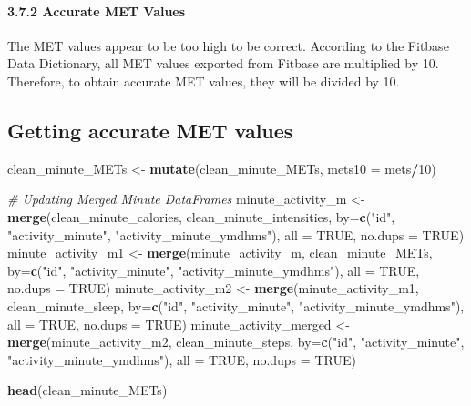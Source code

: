 \documentclass[
]{article}
\newenvironment{Shaded}{\begin{snugshade}}{\end{snugshade}}
\newcommand{\AttributeTok}[1]{\textcolor[rgb]{0.13,0.29,0.53}{#1}}
\newcommand{\CommentTok}[1]{\textcolor[rgb]{0.56,0.35,0.01}{\textit{#1}}}
\newcommand{\ConstantTok}[1]{\textcolor[rgb]{0.56,0.35,0.01}{#1}}
\newcommand{\DecValTok}[1]{\textcolor[rgb]{0.00,0.00,0.81}{#1}}
\newcommand{\FunctionTok}[1]{\textcolor[rgb]{0.13,0.29,0.53}{\textbf{#1}}}
\newcommand{\NormalTok}[1]{#1}
\newcommand{\OtherTok}[1]{\textcolor[rgb]{0.56,0.35,0.01}{#1}}
\newcommand{\SpecialCharTok}[1]{\textcolor[rgb]{0.81,0.36,0.00}{\textbf{#1}}}
\newcommand{\StringTok}[1]{\textcolor[rgb]{0.31,0.60,0.02}{#1}}
\begin{document}
\hypertarget{accurate-met-values}{%
\paragraph{3.7.2 Accurate MET Values}\label{accurate-met-values}}

The MET values appear to be too high to be correct. According to the
Fitbase Data Dictionary, all MET values exported from Fitbase are
multiplied by 10. Therefore, to obtain accurate MET values, they will be
divided by 10.

\hypertarget{getting-accurate-met-values}{%
\subsection{Getting accurate MET
values}\label{getting-accurate-met-values}}

\begin{Shaded}
\begin{Highlighting}[]
\NormalTok{clean\_minute\_METs }\OtherTok{\textless{}{-}} \FunctionTok{mutate}\NormalTok{(clean\_minute\_METs, }\AttributeTok{mets10 =}\NormalTok{ mets}\SpecialCharTok{/}\DecValTok{10}\NormalTok{)}


\CommentTok{\# Updating Merged Minute DataFrames}
\NormalTok{minute\_activity\_m }\OtherTok{\textless{}{-}} \FunctionTok{merge}\NormalTok{(clean\_minute\_calories, clean\_minute\_intensities, }\AttributeTok{by=}\FunctionTok{c}\NormalTok{(}\StringTok{"id"}\NormalTok{, }\StringTok{"activity\_minute"}\NormalTok{, }\StringTok{"activity\_minute\_ymdhms"}\NormalTok{), }\AttributeTok{all =} \ConstantTok{TRUE}\NormalTok{, }\AttributeTok{no.dups =} \ConstantTok{TRUE}\NormalTok{)}
\NormalTok{minute\_activity\_m1 }\OtherTok{\textless{}{-}} \FunctionTok{merge}\NormalTok{(minute\_activity\_m, clean\_minute\_METs, }\AttributeTok{by=}\FunctionTok{c}\NormalTok{(}\StringTok{"id"}\NormalTok{, }\StringTok{"activity\_minute"}\NormalTok{, }\StringTok{"activity\_minute\_ymdhms"}\NormalTok{), }\AttributeTok{all =} \ConstantTok{TRUE}\NormalTok{, }\AttributeTok{no.dups =} \ConstantTok{TRUE}\NormalTok{)}
\NormalTok{minute\_activity\_m2 }\OtherTok{\textless{}{-}} \FunctionTok{merge}\NormalTok{(minute\_activity\_m1, clean\_minute\_sleep, }\AttributeTok{by=}\FunctionTok{c}\NormalTok{(}\StringTok{"id"}\NormalTok{, }\StringTok{"activity\_minute"}\NormalTok{, }\StringTok{"activity\_minute\_ymdhms"}\NormalTok{), }\AttributeTok{all =} \ConstantTok{TRUE}\NormalTok{, }\AttributeTok{no.dups =} \ConstantTok{TRUE}\NormalTok{)}
\NormalTok{minute\_activity\_merged }\OtherTok{\textless{}{-}} \FunctionTok{merge}\NormalTok{(minute\_activity\_m2, clean\_minute\_steps, }\AttributeTok{by=}\FunctionTok{c}\NormalTok{(}\StringTok{"id"}\NormalTok{, }\StringTok{"activity\_minute"}\NormalTok{, }\StringTok{"activity\_minute\_ymdhms"}\NormalTok{), }\AttributeTok{all =} \ConstantTok{TRUE}\NormalTok{, }\AttributeTok{no.dups =} \ConstantTok{TRUE}\NormalTok{)}

\FunctionTok{head}\NormalTok{(clean\_minute\_METs)}
\end{Highlighting}
\end{Shaded}
\end{document}

